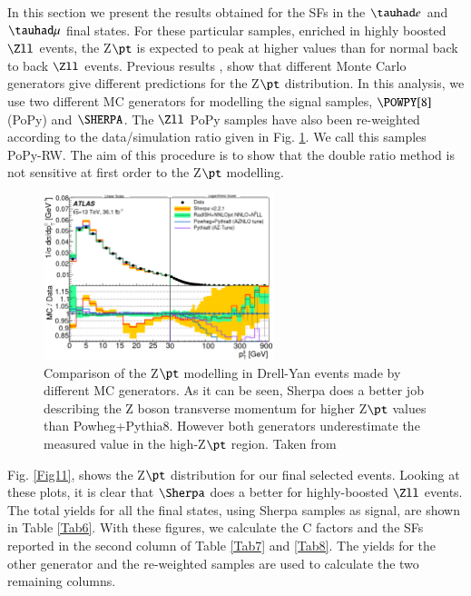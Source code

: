 In this section we present the results obtained for the SFs in the $\tauhad e$ and $\tauhad \mu$ final states. For these particular samples, enriched in highly boosted $\Zll$ events, the Z$\pt$ is expected to peak at higher values than for normal back to back $\Zll$ events. Previous results \cite{Aad:2019wmn}, show that different Monte Carlo generators give different predictions for the Z$\pt$ distribution. In this analysis, we use two different MC generators for modelling the signal samples, $\POWPY[8]$(PoPy) and $\SHERPA$. The $\Zll$ PoPy samples have also been re-weighted according to the data/simulation ratio given in Fig. \ref{Fig10}. We call this samples PoPy-RW. The aim of this procedure is to show that the double ratio method is not sensitive at first order to the Z$\pt$ modelling.

\begin{figure}[htbp]
	\centering
	\includegraphics[width=0.6\textwidth]{figures/Fig10}
	\caption{Comparison of the Z$\pt$ modelling in Drell-Yan events made by different MC generators. As it can be seen, Sherpa does a better job describing the Z boson transverse momentum for higher Z$\pt$ values than Powheg+Pythia8. However both generators underestimate the measured value in the high-Z$\pt$ region. Taken from \cite{Aad:2019wmn}}
	\label{Fig10}
\end{figure}

Fig. \ref{Fig11}, shows the Z$\pt$ distribution for our final selected events. Looking at these plots, it is clear that $\Sherpa$ does a better for highly-boosted $\Zll$ events. The total yields for all the final states, using Sherpa samples as signal, are shown in Table \ref{Tab6}. With these figures, we calculate the C factors and the SFs reported in the second column of Table \ref{Tab7} and \ref{Tab8}. The yields for the other generator and the re-weighted samples are used to calculate the two remaining columns.

